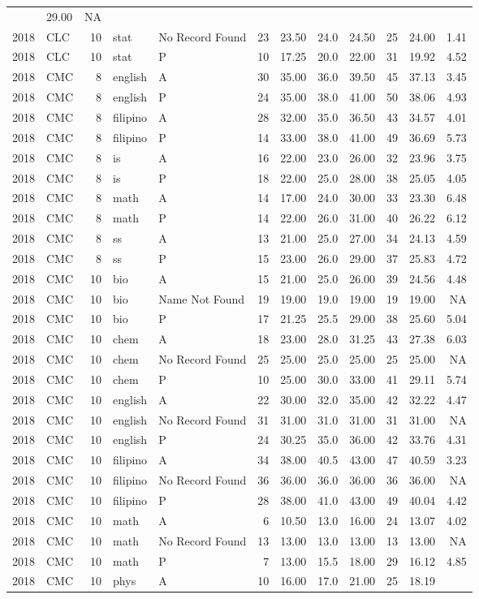 \documentclass[]{article}
\begin{document}
\begin{longtable}[]{@{}rlrllrrrrrrr@{}}
& 29.00 & NA\tabularnewline
2018 & CLC & 10 & stat & No Record Found & 23 & 23.50 & 24.0 & 24.50 &
25 & 24.00 & 1.41\tabularnewline
2018 & CLC & 10 & stat & P & 10 & 17.25 & 20.0 & 22.00 & 31 & 19.92 &
4.52\tabularnewline
2018 & CMC & 8 & english & A & 30 & 35.00 & 36.0 & 39.50 & 45 & 37.13 &
3.45\tabularnewline
2018 & CMC & 8 & english & P & 24 & 35.00 & 38.0 & 41.00 & 50 & 38.06 &
4.93\tabularnewline
2018 & CMC & 8 & filipino & A & 28 & 32.00 & 35.0 & 36.50 & 43 & 34.57 &
4.01\tabularnewline
2018 & CMC & 8 & filipino & P & 14 & 33.00 & 38.0 & 41.00 & 49 & 36.69 &
5.73\tabularnewline
2018 & CMC & 8 & is & A & 16 & 22.00 & 23.0 & 26.00 & 32 & 23.96 &
3.75\tabularnewline
2018 & CMC & 8 & is & P & 18 & 22.00 & 25.0 & 28.00 & 38 & 25.05 &
4.05\tabularnewline
2018 & CMC & 8 & math & A & 14 & 17.00 & 24.0 & 30.00 & 33 & 23.30 &
6.48\tabularnewline
2018 & CMC & 8 & math & P & 14 & 22.00 & 26.0 & 31.00 & 40 & 26.22 &
6.12\tabularnewline
2018 & CMC & 8 & ss & A & 13 & 21.00 & 25.0 & 27.00 & 34 & 24.13 &
4.59\tabularnewline
2018 & CMC & 8 & ss & P & 15 & 23.00 & 26.0 & 29.00 & 37 & 25.83 &
4.72\tabularnewline
2018 & CMC & 10 & bio & A & 15 & 21.00 & 25.0 & 26.00 & 39 & 24.56 &
4.48\tabularnewline
2018 & CMC & 10 & bio & Name Not Found & 19 & 19.00 & 19.0 & 19.00 & 19
& 19.00 & NA\tabularnewline
2018 & CMC & 10 & bio & P & 17 & 21.25 & 25.5 & 29.00 & 38 & 25.60 &
5.04\tabularnewline
2018 & CMC & 10 & chem & A & 18 & 23.00 & 28.0 & 31.25 & 43 & 27.38 &
6.03\tabularnewline
2018 & CMC & 10 & chem & No Record Found & 25 & 25.00 & 25.0 & 25.00 &
25 & 25.00 & NA\tabularnewline
2018 & CMC & 10 & chem & P & 10 & 25.00 & 30.0 & 33.00 & 41 & 29.11 &
5.74\tabularnewline
2018 & CMC & 10 & english & A & 22 & 30.00 & 32.0 & 35.00 & 42 & 32.22 &
4.47\tabularnewline
2018 & CMC & 10 & english & No Record Found & 31 & 31.00 & 31.0 & 31.00
& 31 & 31.00 & NA\tabularnewline
2018 & CMC & 10 & english & P & 24 & 30.25 & 35.0 & 36.00 & 42 & 33.76 &
4.31\tabularnewline
2018 & CMC & 10 & filipino & A & 34 & 38.00 & 40.5 & 43.00 & 47 & 40.59
& 3.23\tabularnewline
2018 & CMC & 10 & filipino & No Record Found & 36 & 36.00 & 36.0 & 36.00
& 36 & 36.00 & NA\tabularnewline
2018 & CMC & 10 & filipino & P & 28 & 38.00 & 41.0 & 43.00 & 49 & 40.04
& 4.42\tabularnewline
2018 & CMC & 10 & math & A & 6 & 10.50 & 13.0 & 16.00 & 24 & 13.07 &
4.02\tabularnewline
2018 & CMC & 10 & math & No Record Found & 13 & 13.00 & 13.0 & 13.00 &
13 & 13.00 & NA\tabularnewline
2018 & CMC & 10 & math & P & 7 & 13.00 & 15.5 & 18.00 & 29 & 16.12 &
4.85\tabularnewline
2018 & CMC & 10 & phys & A & 10 & 16.00 & 17.0 & 21.00 & 25 & 18.19 &

\end{longtable}
\end{document}
